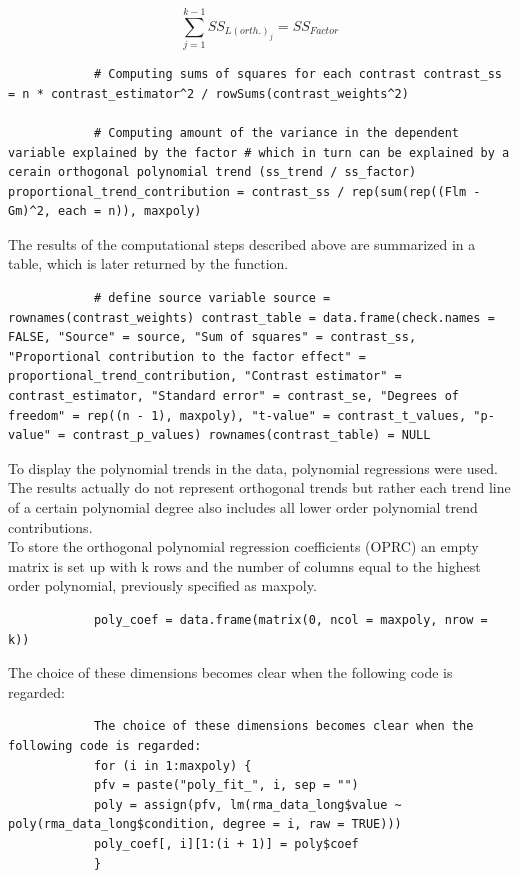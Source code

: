 \documentclass[11pt]{article}
\begin{document}
		\begin{equation}
			\sum_{j=1}^{k-1}SS_{L(orth.)_j} = SS_{Factor}
		\end{equation}
					
		\begin{lstlisting}
			# Computing sums of squares for each contrast contrast_ss = n * contrast_estimator^2 / rowSums(contrast_weights^2)
			
			# Computing amount of the variance in the dependent variable explained by the factor # which in turn can be explained by a cerain orthogonal polynomial trend (ss_trend / ss_factor) proportional_trend_contribution = contrast_ss / rep(sum(rep((Flm - Gm)^2, each = n)), maxpoly)
		\end{lstlisting}
		
		The results of the computational steps described above are summarized in a table, which is later returned by the function.
		
		\begin{lstlisting}
			# define source variable source = rownames(contrast_weights) contrast_table = data.frame(check.names = FALSE, "Source" = source, "Sum of squares" = contrast_ss, "Proportional contribution to the factor effect" = proportional_trend_contribution, "Contrast estimator" = contrast_estimator, "Standard error" = contrast_se, "Degrees of freedom" = rep((n - 1), maxpoly), "t-value" = contrast_t_values, "p-value" = contrast_p_values) rownames(contrast_table) = NULL
		\end{lstlisting}
			
		To display the polynomial trends in the data, polynomial regressions were used. The results actually do not represent orthogonal trends but rather each trend line of a certain polynomial degree also includes all lower order polynomial trend contributions.\\
		
		To store the orthogonal polynomial regression coefficients (OPRC) an empty matrix is set up with k rows and the number of columns equal to the highest order polynomial, previously specified as maxpoly.
		
		\begin{lstlisting}
			poly_coef = data.frame(matrix(0, ncol = maxpoly, nrow = k))	
		\end{lstlisting}
		
		The choice of these dimensions becomes clear when the following code is regarded:
		
		\begin{lstlisting}
			The choice of these dimensions becomes clear when the following code is regarded:
			for (i in 1:maxpoly) {
			pfv = paste("poly_fit_", i, sep = "")
			poly = assign(pfv, lm(rma_data_long$value ~ poly(rma_data_long$condition, degree = i, raw = TRUE)))
			poly_coef[, i][1:(i + 1)] = poly$coef
			}	
		\end{lstlisting}
		
\end{document}
